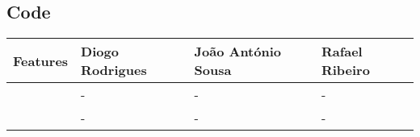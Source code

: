\subsection{Code}
\begin{center}
    \begin{tabular}{l | p{32mm} p{32mm} p{32mm}}
        Features & Diogo Rodrigues & João António Sousa & Rafael Ribeiro \\ \hline
                 & -               & -                  & -              \\
                 & -               & -                  & -
    \end{tabular}
\end{center}
